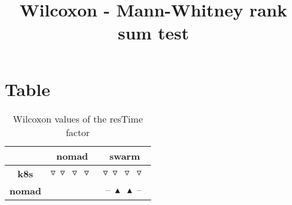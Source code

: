 \documentclass{article}
\title{Wilcoxon - Mann-Whitney rank sum test}
\author{}
\begin{document}
\maketitle
\section{Table}
\begin{table}[!htp]
  \caption{Wilcoxon values of the resTime factor}
  \label{table:resTime}
  \centering
  \begin{scriptsize}
  \begin{tabular}{c|cc}
      & \textbf{nomad} & \textbf{swarm} \\\hline
      \textbf{k8s} & $\triangledown\ \triangledown\ \triangledown\ \triangledown\  $ & $ \triangledown\ \triangledown\ \triangledown\ \triangledown\ $ \\
      \textbf{nomad} & $ $ & $ \text{--}\ \blacktriangle\ \blacktriangle\ \text{--}\ $ \\
  \end{tabular}
  \end{scriptsize}
\end{table}
\end{document}
